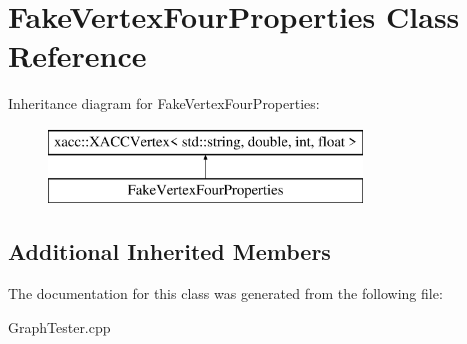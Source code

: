 \hypertarget{a01220}{}\section{Fake\+Vertex\+Four\+Properties Class Reference}
\label{a01220}
Inheritance diagram for Fake\+Vertex\+Four\+Properties\+:\begin{figure}[H]
\begin{center}
\leavevmode
\includegraphics[height=2.000000cm]{a01220}
\end{center}
\end{figure}
\subsection*{Additional Inherited Members}


The documentation for this class was generated from the following file\+:\begin{DoxyCompactItemize}
\item 
Graph\+Tester.\+cpp\end{DoxyCompactItemize}
